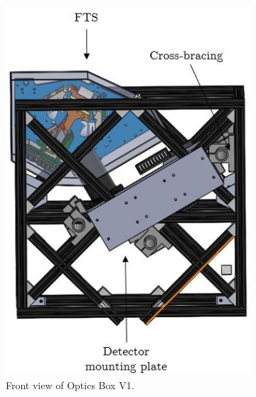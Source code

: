 \begin{figure}
    \centering
    \begin{subfigure}[h]{0.4\textwidth}
        \centering
        \includegraphics[width=\textwidth]{chap3_images/LIFE_V1_images/Optics_Box_V1_V0_front_view_labelled.JPG}
        \caption{Front view of Optics Box V1.}
        \label{fig:OB_V1_front}
    \end{subfigure}
    \begin{subfigure}[h]{0.42\textwidth}
        \centering

\end{subfigure}
\end{figure}
